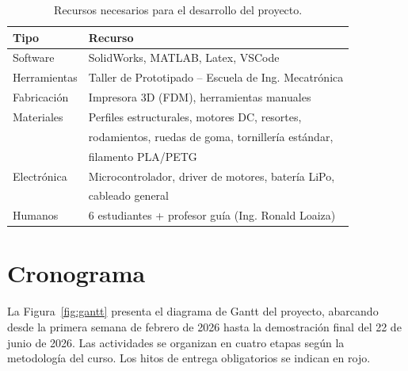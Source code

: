 \documentclass[lettersize,journal]{IEEEtran}
\begin{document}
\begin{table}[H]
\centering
\caption{Recursos necesarios para el desarrollo del proyecto.}
\label{tab:recursos}
\begin{tabular}{ll}
\toprule
\textbf{Tipo} & \textbf{Recurso} \\
\midrule
Software      & SolidWorks, MATLAB, Latex, VSCode \\
Herramientas  & Taller de Prototipado -- Escuela de Ing. Mecatrónica \\
Fabricación   & Impresora 3D (FDM), herramientas manuales \\
Materiales    & Perfiles estructurales, motores DC, resortes, \\
              & rodamientos, ruedas de goma, tornillería estándar, \\
              & filamento PLA/PETG \\
Electrónica   & Microcontrolador, driver de motores, batería LiPo, \\
              & cableado general \\
Humanos       & 6 estudiantes + profesor guía (Ing. Ronald Loaiza) \\
\bottomrule
\end{tabular}
\end{table}


\section{\textbf{Cronograma}}

La Figura~\ref{fig:gantt} presenta el diagrama de Gantt del proyecto, abarcando desde
la primera semana de febrero de 2026 hasta la demostración final del 22 de junio de
2026. Las actividades se organizan en cuatro etapas según la metodología del curso.
Los hitos de entrega obligatorios se indican en rojo.
\end{document}
